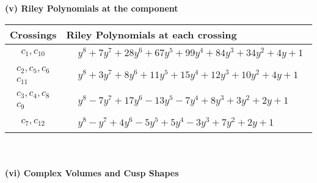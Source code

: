 \documentclass[1p]{elsarticle_modified}
\theoremstyle{definition}
\begin{document}
\newpage\renewcommand{\arraystretch}{1}
\flushleft \textbf{(v) Riley Polynomials at the component}\newline \\
\begin{tabular}{m{50pt}|m{274pt}}
Crossings & \hspace{64pt}Riley Polynomials at each crossing \\
\hline $$\begin{aligned}c_{1},c_{10}\end{aligned}$$&$\begin{aligned}
&y^8+7 y^7+28 y^6+67 y^5+99 y^4+84 y^3+34 y^2+4 y+1
\end{aligned}$\\
\hline $$\begin{aligned}c_{2},c_{5},c_{6}\\c_{11}\end{aligned}$$&$\begin{aligned}
&y^8+3 y^7+8 y^6+11 y^5+15 y^4+12 y^3+10 y^2+4 y+1
\end{aligned}$\\
\hline $$\begin{aligned}c_{3},c_{4},c_{8}\\c_{9}\end{aligned}$$&$\begin{aligned}
&y^8-7 y^7+17 y^6-13 y^5-7 y^4+8 y^3+3 y^2+2 y+1
\end{aligned}$\\
\hline $$\begin{aligned}c_{7},c_{12}\end{aligned}$$&$\begin{aligned}
&y^8- y^7+4 y^6-5 y^5+5 y^4-3 y^3+7 y^2+2 y+1
\end{aligned}$\\
\hline
\end{tabular}\\~\\
\newpage\flushleft \textbf{(vi) Complex Volumes and Cusp Shapes}
\end{document}
